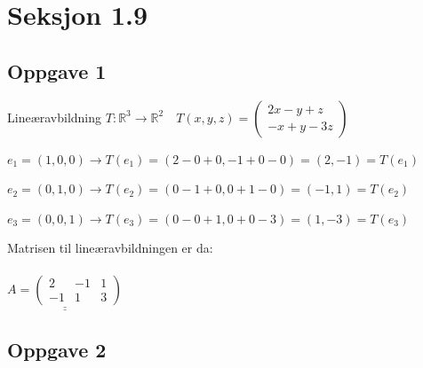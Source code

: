 \documentclass{article}
\date{}
\begin{document}
\section*{Seksjon 1.9}

\subsection*{Oppgave 1}

Lineæravbildning \(T : \mathbb{R}^3 \rightarrow \mathbb{R}^2 \quad T(x,y,z) = \begin{pmatrix}
    2x - y + z \\ -x + y -3z
\end{pmatrix}\) 

\begin{description}
    \item \(e_1 = (1, 0, 0) \rightarrow T(e_1) = (2 - 0 + 0, -1 + 0 - 0) = (2, -1) = T(e_1)\)
    \item \(e_2 = (0, 1, 0) \rightarrow T(e_2) = (0 -1 + 0, 0 + 1 - 0) = (-1, 1) = T(e_2)\)
    \item \(e_3 = (0, 0, 1) \rightarrow T(e_3) = (0 - 0 + 1, 0 + 0 - 3) = (1, -3) = T(e_3)\)
\end{description}

Matrisen til lineæravbildningen er da: \\ \\
\(\underline{\underline{A = \begin{pmatrix}
    2 & -1 & 1 \\ -1 & 1 & 3
\end{pmatrix}}}\)

\hfill

\subsection*{Oppgave 2}
\end{document}
